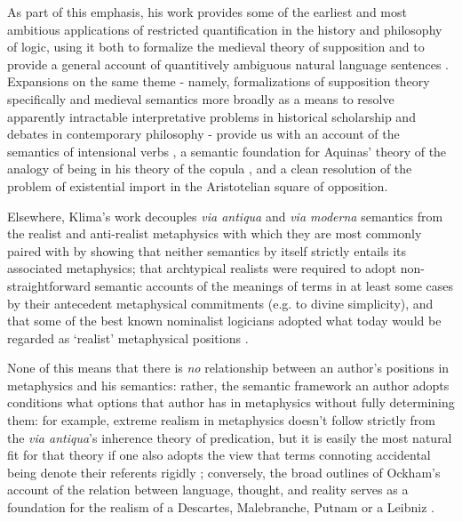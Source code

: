 \documentclass[]{article}
\begin{document}
As part of this emphasis, 
his work provides some of the earliest and most ambitious applications of restricted quantification in the history and philosophy of logic, 
using it both to formalize the medieval theory of supposition and to provide a general account of quantitively ambiguous natural language sentences \autocite{Klima1988,Klima1990,KlimaSandu1990,Klima1991b}. 
Expansions on the same theme - 
namely, formalizations of supposition theory specifically and medieval semantics more broadly as a means to resolve apparently intractable interpretative problems in historical scholarship and debates in contemporary philosophy - 
provide us with an account of the semantics of intensional verbs \autocite{Klima1991}, 
a semantic foundation for Aquinas' theory of the analogy of being in his theory of the copula \autocite{Klima1996,Klima2002}, 
and a clean resolution of the problem of existential import in the Aristotelian square of opposition\autocite{Klima2001}. 

Elsewhere, Klima's work decouples \emph{via antiqua} and \emph{via moderna} semantics from the realist and anti-realist metaphysics with which they are most commonly paired with by showing 
that neither semantics by itself strictly entails its associated metaphysics; 
that archtypical realists were required to adopt non-straightforward semantic accounts of the meanings of terms in at least some cases by their antecedent metaphysical commitments (e.g. to divine simplicity),
and that some of the best known nominalist logicians adopted what today would be regarded as `realist' metaphysical positions \autocite{Klima1999,Klima2005,Klima2011}. 

None of this means that there is \emph{no} relationship between an author's positions in metaphysics and his semantics: 
rather, the semantic framework an author adopts conditions what options that author has in metaphysics without fully determining them: 
for example, extreme realism in metaphysics doesn't follow strictly from the \emph{via antiqua}'s inherence theory of predication, 
but it is easily the most natural fit for that theory if one also adopts the view that terms connoting accidental being denote their referents rigidly \autocite{Klima1999}; 
conversely, the broad outlines of Ockham's account of the relation between language, thought, and reality serves as a foundation for the realism of a Descartes, Malebranche, Putnam or a Leibniz \autocite{Klima1991}.
\end{document}
